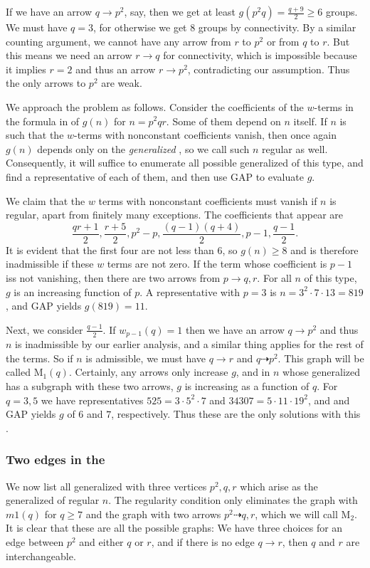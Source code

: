 \documentclass[draft]{article}
\newcommand{\m}[1]{\text{M}_{#1}}
\theoremstyle{plain}
\theoremstyle{definition}
\begin{document}
If we have an arrow $q \rightarrow p^2$, say, then we get at least $g(p^2 q) = \frac{q + 9}{2} \ge 6$ groups. We must have $q = 3$, for otherwise we get 8 groups by connectivity. By a similar counting argument, we cannot have any arrow from $r$ to $p^2$ or from $q$ to $r$. But this means we need an arrow $r \rightarrow q$ for connectivity, which is impossible because it implies $r = 2$ and thus an arrow $r \rightarrow p^2$, contradicting our assumption. Thus the only arrows to $p^2$ are weak.

We approach the problem as follows. Consider the coefficients of the $w$-terms in the formula in  of $g(n)$ for $n = p^2 q r$. Some of them depend on $n$ itself. If $n$ is such that the $w$-terms with nonconstant coefficients vanish, then once again $g(n)$ depends only on the \emph{generalized} \hg[1], so we call such $n$ regular as well. Consequently, it will suffice to enumerate all possible generalized \hgs[1] of this type, and find a representative of each of them, and then use GAP to evaluate $g$. 

We claim that the $w$ terms with nonconstant coefficients must vanish if $n$ is regular, apart from finitely many exceptions. The coefficients that appear are \[\frac{qr + 1}{2}, \frac{r + 5}{2}, p^2 - p, \frac{(q - 1)(q + 4)}{2}, p - 1, \frac{q - 1}{2}.\] It is evident that the first four are not less than $6$, so $g(n) \ge 8$ and is therefore inadmissible if these $w$ terms are not zero. If the term whose  coefficient is $p - 1$ iss not vanishing, then there are two arrows from $p \rightarrow q, r$. For all $n$ of this type, $g$ is an increasing function of $p$. A representative with $p = 3$ is $n = 3^2 \cdot 7 \cdot 13 = 819$, and GAP yields $g(819) = 11$.

Next, we consider $\frac{q - 1}{2}$.  If $w_{p - 1}(q) = 1$ then we have an arrow $q \rightarrow p^2$ and thus $n$ is inadmissible by our earlier analysis, and a similar thing applies for the rest of the terms. So if $n$ is admissible, we must have $q \rightarrow r$ and $q \dashrightarrow p^2$. This graph will be called $\m{1}(q)$. Certainly, any arrows only increase $g$, and in $n$ whose generalized \hg[1] has a subgraph with these two arrows, $g$ is increasing as a function of $q$. For $q = 3, 5$ we have representatives $525 = 3 \cdot 5^2 \cdot 7$ and $34307 = 5 \cdot 11 \cdot 19^2$, and and GAP yields $g$ of $6$ and $7$, respectively. Thus these are the only solutions with this \hg[1].


\subsubsection*{Two edges in the \hg[1]}
We now list all generalized \hg[1] with three vertices $p^2, q, r$ which arise as the generalized \hgs[1] of regular $n$. The regularity condition only eliminates the graph with $m1(q)$ for $q \ge 7$ and the graph with two arrows $p^2 \dashrightarrow q, r$, which we will call $\m2$. It is clear that these are all the possible graphs: We have three choices for an edge between $p^2$ and either $q$ or $r$, and if there is no edge $q \rightarrow r$, then $q$ and $r$ are interchangeable.
\end{document}
